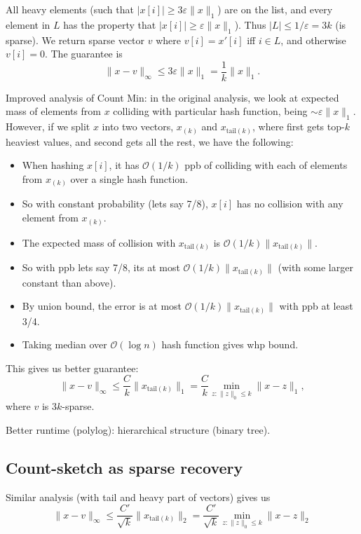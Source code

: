 \documentclass[11pt]{article}
\newcommand{\bigo}{\mathcal{O}}
\begin{document}
All heavy elements (such that $|x[i]| \ge 3 \varepsilon \|x\|_1$) are on the list, and every element in $L$ has the property that $|x[i]| \ge \varepsilon \|x\|_1$). Thus $|L| \le 1/\varepsilon = 3k$ (is sparse). We return sparse vector $v$ where $v[i] = x'[i]$ iff $i \in L$, and otherwise $v[i] = 0$. The guarantee is
$$ \|x-v\|_\infty \le 3\varepsilon \|x\|_1 = \frac{1}{k} \|x\|_1.$$


Improved analysis of Count Min: in the original analysis, we look at expected mass of elements from $x$ colliding with particular hash function, being $\sim \varepsilon \|x\|_1$. However, if we split $x$ into two vectors, $x_{(k)}$ and $x_{\text{tail}(k)}$, where first gets top-$k$ heaviest values, and second gets all the rest, we have the following:
\begin{itemize}
\item When hashing $x[i]$, it has $\bigo(1/k)$ ppb of colliding with each of elements from $x_{(k)}$ over a single hash function.
\item So with constant probability (lets say 7/8), $x[i]$ has no collision with any element from $x_{(k)}$.
\item The expected mass of collision with $x_{\text{tail}(k)}$ is $\bigo(1/k) \|x_{\text{tail}(k)}\|$.
\item So with ppb lets say 7/8, its at most $\bigo(1/k) \|x_{\text{tail}(k)}\|$ (with some larger constant than above).
\item By union bound, the error is at most $\bigo(1/k) \|x_{\text{tail}(k)}\|$ with ppb at least 3/4.
\item Taking median over $\bigo(\log n)$ hash function gives whp bound.
\end{itemize}

This gives us better guarantee:
$$ \|x-v\|_\infty \le  \frac{C}{k} \|x_{\text{tail}(k)}\|_1 = \frac{C}{k} \min_{z : \|z\|_0 \le k} \|x-z\|_1,$$
where $v$ is $3k$-sparse.


Better runtime (polylog): hierarchical structure (binary tree).


\subsection{Count-sketch as sparse recovery}
Similar analysis (with tail and heavy part of vectors) gives us
$$ \|x - v\|_\infty \le \frac{C'}{\sqrt{k}} \|x_{\text{tail}(k)}\|_2 =  \frac{C'}{\sqrt{k}} \min_{z : \|z\|_0 \le k} \|x-z\|_2$$
\end{document}
